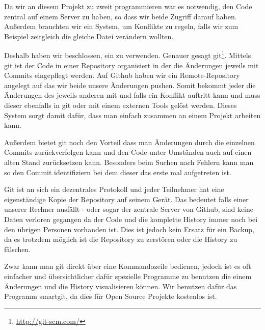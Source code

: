 Da wir an diesem Projekt zu zweit programmieren war es notwendig, den Code zentral auf einem Server zu haben, so dass wir beide Zugriff darauf haben.
Außerdem brauchten wir ein System, um Konflikte zu regeln, falls wir zum Beispiel zeitgleich die gleiche Datei verändern wollten.

Deshalb haben wir beschlossen, ein  zu verwenden. Genauer gesagt git\footnote{\url{http://git-scm.com/}}. Mittels git ist der Code in einer Repository organisiert in der die Änderungen jeweils mit Commits eingepflegt werden. Auf Github haben wir ein Remote-Repository angelegt auf das wir beide unsere Änderungen pushen. Somit bekommt jeder die Änderungen des jeweils anderen mit und falls ein Konflikt auftritt kann und muss dieser ebenfalls in git oder mit einem externen Tools gelöst werden. Dieses System sorgt damit dafür, dass man einfach zusammen an einem Projekt arbeiten kann.


Außerdem bietet git noch den Vorteil dass man Änderungen durch die einzelnen Commits zurückverfolgen kann und den Code unter Umständen auch auf einen alten Stand zurücksetzen kann. Besonders beim Suchen nach Fehlern kann man so den Commit identifiziern bei dem dieser das erste mal aufgetreten ist. 

Git ist an sich ein dezentrales Protokoll und jeder Teilnehmer hat eine eigenständige Kopie der Repository auf seinem Gerät. Das bedeutet falls einer unserer Rechner ausfällt - oder sogar der zentrale Server von Github, sind keine Daten verloren gegangen da der Code und die komplette History immer noch bei den übrigen Personen vorhanden ist. Dies ist jedoch kein Ersatz für ein Backup, da es trotzdem möglich ist die Repository zu zerstören oder die History zu fälschen.\cite[S 5f]{PGIT}

Zwar kann man git direkt über eine Kommandozeile bedienen, jedoch ist es oft einfacher und übersichtlicher dafür spezielle Programme zu benutzen die einem Änderungen und die History visualisieren können. Wir benutzen dafür das Programm smartgit, da dies für Open Source Projekte kostenlos ist.

